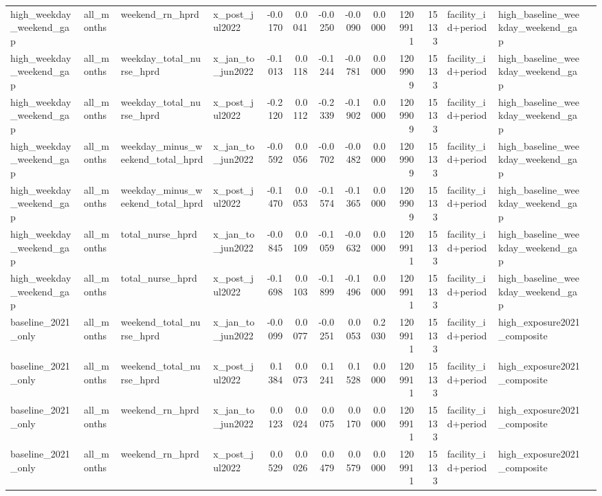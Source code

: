 \begin{tabular}{llllrrrrrrrlll}
high_weekday_weekend_gap & all_months & weekend_rn_hprd & x_post_jul2022 & -0.0170 & 0.0041 & -0.0250 & -0.0090 & 0.0000 & 1209911 & 15133 & facility_id+period & high_baseline_weekday_weekend_gap &  \\
high_weekday_weekend_gap & all_months & weekday_total_nurse_hprd & x_jan_to_jun2022 & -0.1013 & 0.0118 & -0.1244 & -0.0781 & 0.0000 & 1209909 & 15133 & facility_id+period & high_baseline_weekday_weekend_gap &  \\
high_weekday_weekend_gap & all_months & weekday_total_nurse_hprd & x_post_jul2022 & -0.2120 & 0.0112 & -0.2339 & -0.1902 & 0.0000 & 1209909 & 15133 & facility_id+period & high_baseline_weekday_weekend_gap &  \\
high_weekday_weekend_gap & all_months & weekday_minus_weekend_total_hprd & x_jan_to_jun2022 & -0.0592 & 0.0056 & -0.0702 & -0.0482 & 0.0000 & 1209909 & 15133 & facility_id+period & high_baseline_weekday_weekend_gap &  \\
high_weekday_weekend_gap & all_months & weekday_minus_weekend_total_hprd & x_post_jul2022 & -0.1470 & 0.0053 & -0.1574 & -0.1365 & 0.0000 & 1209909 & 15133 & facility_id+period & high_baseline_weekday_weekend_gap &  \\
high_weekday_weekend_gap & all_months & total_nurse_hprd & x_jan_to_jun2022 & -0.0845 & 0.0109 & -0.1059 & -0.0632 & 0.0000 & 1209911 & 15133 & facility_id+period & high_baseline_weekday_weekend_gap &  \\
high_weekday_weekend_gap & all_months & total_nurse_hprd & x_post_jul2022 & -0.1698 & 0.0103 & -0.1899 & -0.1496 & 0.0000 & 1209911 & 15133 & facility_id+period & high_baseline_weekday_weekend_gap &  \\
baseline_2021_only & all_months & weekend_total_nurse_hprd & x_jan_to_jun2022 & -0.0099 & 0.0077 & -0.0251 & 0.0053 & 0.2030 & 1209911 & 15133 & facility_id+period & high_exposure2021_composite &  \\
baseline_2021_only & all_months & weekend_total_nurse_hprd & x_post_jul2022 & 0.1384 & 0.0073 & 0.1241 & 0.1528 & 0.0000 & 1209911 & 15133 & facility_id+period & high_exposure2021_composite &  \\
baseline_2021_only & all_months & weekend_rn_hprd & x_jan_to_jun2022 & 0.0123 & 0.0024 & 0.0075 & 0.0170 & 0.0000 & 1209911 & 15133 & facility_id+period & high_exposure2021_composite &  \\
baseline_2021_only & all_months & weekend_rn_hprd & x_post_jul2022 & 0.0529 & 0.0026 & 0.0479 & 0.0579 & 0.0000 & 1209911 & 15133 & facility_id+period & high_exposure2021_composite &  \\

\end{tabular}
